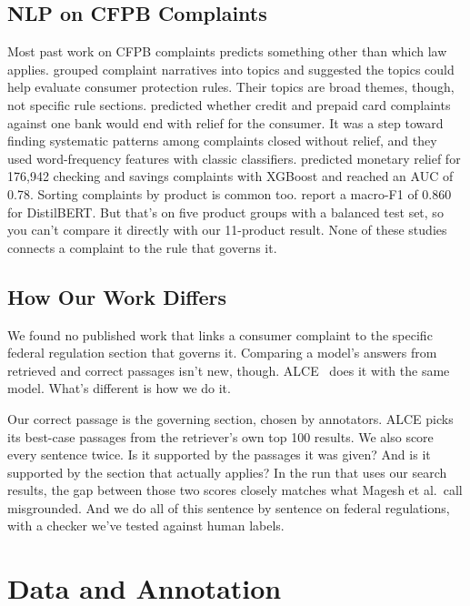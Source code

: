 \documentclass[10pt]{article}
\begin{document}
\subsection{NLP on CFPB Complaints}
Most past work on CFPB complaints predicts something other than which law
applies. \citet{bastani2019lda} grouped complaint narratives into
topics and suggested the topics could help evaluate consumer protection rules.
Their topics are broad themes, though, not specific rule sections.
\citet{gao2023anomalies} predicted whether credit and prepaid card
complaints against one bank would end with relief for the consumer. It was a
step toward finding systematic patterns among complaints closed without relief,
and they used word-frequency features with classic classifiers.
\citet{wang2026relief} predicted monetary relief for 176,942 checking and
savings complaints with XGBoost and reached an AUC of 0.78. Sorting complaints by
product is common too. \citet{airani2025ensembling} report a
macro-F1 of 0.860 for DistilBERT. But that's on five product groups with a
balanced test set, so you can't compare it directly with our 11-product result.
None of these studies connects a complaint to the rule that governs it.

\subsection{How Our Work Differs}\label{sec:differs}
We found no published work that links a consumer complaint to the specific
federal regulation section that governs it. Comparing a model's answers from
retrieved and correct passages isn't new, though. ALCE~\cite{gao2023alce} does it
with the same model. What's different is how we do it.

Our correct passage is the governing section, chosen by annotators. ALCE picks
its best-case passages from the retriever's own top 100 results. We also score
every sentence twice. Is it supported by the passages it was given? And is it
supported by the section that actually applies? In the run that uses our search
results, the gap between those two scores closely matches what Magesh et al.\
call misgrounded. And we do all of this sentence by sentence on federal
regulations, with a checker we've tested against human labels.

\section{Data and Annotation}
\end{document}
